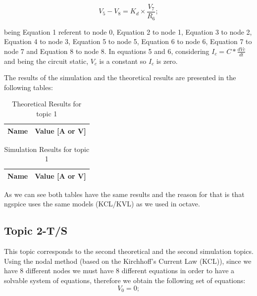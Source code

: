\begin{equation} 	%
  V_5-V_8=K_d\times\frac{V_7}{R_6}   ;
  \label{eq:8}
\end{equation}

being Equation 1 referent to node 0, Equation 2 to node 1, Equation 3 to node 2, Equation 4 to node 3, Equation 5 to node 5, Equation 6 to node 6, Equation 7 to node 7
and Equation 8 to node 8.  
In equations 5 and 6, considering $I_c = C*\frac{dVc}{dt}$ and being the circuit static, $V_c$ is a constant so $I_c$ is zero.

The results of the simulation and the theoretical results are presented in the following tables:

\begin{table}[h]
  \centering
  \begin{tabular}{|l|r|}
    \hline    
    {\bf Name} & {\bf Value [A or V]} \\ \hline
    
  \end{tabular}
  \caption{Theoretical Results for topic 1}
  \label{tab:tabela1}
\end{table}

 \begin{table}[h]
  \centering
  \begin{tabular}{|l|r|}
    \hline    
    {\bf Name} & {\bf Value [A or V]} \\ \hline
                                       
  \end{tabular}
  \caption{Simulation Results for topic 1}
  \label{tab:tabela2}
\end{table}

As we can see both tables have the same results and the reason for that is that ngspice uses the same models (KCL/KVL) as we used in octave.
\subsection{Topic 2-T/S}
This topic corresponds to the second theoretical and the second simulation topics.
Using the nodal method (based on the Kirchhoff's Current Law (KCL)), since we have 8 different nodes we must have 8 different 
equations in order to have a solvable system of equations, therefore we obtain the following set of equations:
\begin{equation} 
  V_0=0          ;
  \label{eq:1.1}
\end{equation}

